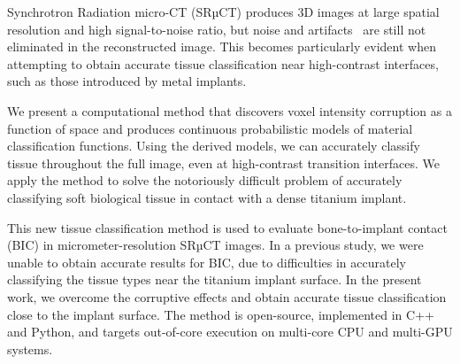Synchrotron Radiation micro-CT (SRµCT) produces 3D images at large spatial
resolution and high signal-to-noise ratio, but noise and
artifacts~\cite{adv_in_srmicroct} are still not eliminated in the reconstructed
image. This becomes particularly evident when attempting to obtain accurate
tissue classification near high-contrast interfaces, such as those introduced
by metal implants.

We present a computational method that discovers voxel intensity corruption as
a function of space and produces continuous probabilistic models of material
classification functions. Using the derived models, we can accurately classify
tissue throughout the full image, even at high-contrast transition interfaces.
We apply the method to solve the notoriously difficult problem of accurately
classifying soft biological tissue in contact with a dense titanium implant.

This new tissue classification method is used to evaluate bone-to-implant
contact (BIC) in micrometer-resolution SRµCT images. In a previous study, we
were unable to obtain accurate results for BIC, due to difficulties in
accurately classifying the tissue types near the titanium implant surface. In
the present work, we overcome the corruptive effects and obtain accurate tissue
classification close to the implant surface.
The method is open-source, implemented in C++ and Python, and targets
out-of-core execution on multi-core CPU and multi-GPU systems.

